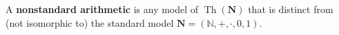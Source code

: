 A \textbf{nonstandard arithmetic} is any model of $\operatorname{Th}(\mathbf{N})$ that is distinct from (not isomorphic to) the standard model $\mathbf{N} = (\mathbb{N}, +, \cdot, 0, 1)$.

